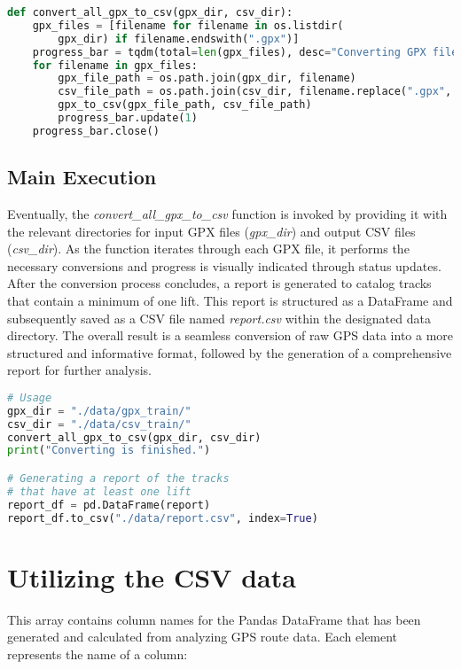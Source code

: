 \begin{lstlisting}[language=Python]
def convert_all_gpx_to_csv(gpx_dir, csv_dir):
    gpx_files = [filename for filename in os.listdir(
        gpx_dir) if filename.endswith(".gpx")]
    progress_bar = tqdm(total=len(gpx_files), desc="Converting GPX files")
    for filename in gpx_files:
        gpx_file_path = os.path.join(gpx_dir, filename)
        csv_file_path = os.path.join(csv_dir, filename.replace(".gpx", ".csv"))
        gpx_to_csv(gpx_file_path, csv_file_path)
        progress_bar.update(1)
    progress_bar.close()
\end{lstlisting}

\subsection{Main Execution}
\label{sec:data:main}

Eventually, the \textit{convert\_all\_gpx\_to\_csv} function is invoked by providing it with the relevant directories for input GPX files (\textit{gpx\_dir}) and output CSV files (\textit{csv\_dir}). 
As the function iterates through each GPX file, it performs the necessary conversions and progress is visually indicated through status updates. After the conversion process concludes, 
a report is generated to catalog tracks that contain a minimum of one lift. This report is structured as a DataFrame and subsequently saved as a CSV file named 
\textit{report.csv} within the designated data directory. The overall result is a seamless conversion of raw 
GPS data into a more structured and informative format, followed by the generation of a comprehensive report for further analysis.

\begin{lstlisting}[language=Python]
# Usage
gpx_dir = "./data/gpx_train/"
csv_dir = "./data/csv_train/"
convert_all_gpx_to_csv(gpx_dir, csv_dir)
print("Converting is finished.")

# Generating a report of the tracks 
# that have at least one lift
report_df = pd.DataFrame(report)
report_df.to_csv("./data/report.csv", index=True)
\end{lstlisting}


\section{Utilizing the CSV data}
\label{sec:data-csv}

This array contains column names for the Pandas DataFrame that has been generated and calculated from analyzing GPS route data. Each element represents the name of a column:

